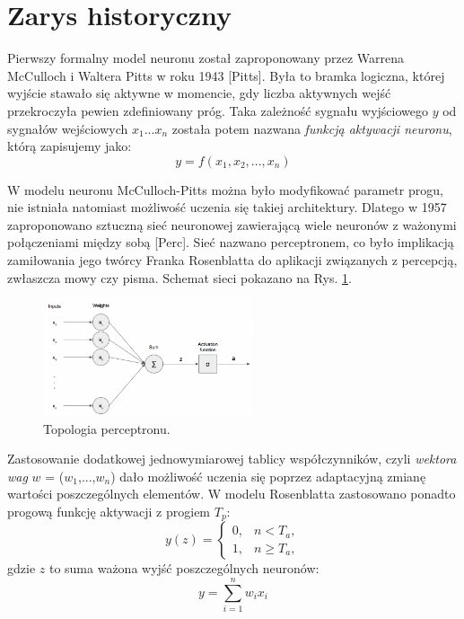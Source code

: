 \section{Zarys historyczny}

Pierwszy formalny model neuronu został zaproponowany przez Warrena McCulloch i Waltera Pitts w roku 1943 [Pitts]. Była to bramka logiczna, której wyjście stawało się aktywne w momencie, gdy liczba aktywnych wejść przekroczyła pewien zdefiniowany próg. Taka zależność sygnału wyjściowego $y$ od sygnałów wejściowych $x_1$...$x_n$ została potem nazwana \textit{funkcją aktywacji neuronu}, którą zapisujemy jako:
\begin{equation}
\label{eqActFunc}
y=f\left(x_1, x_2,..., x_n\right)
\end{equation}

W modelu neuronu McCulloch-Pitts można było modyfikować parametr progu, nie istniała natomiast możliwość uczenia się takiej architektury. Dlatego w 1957 zaproponowano sztuczną sieć neuronowej zawierającą wiele neuronów z ważonymi połączeniami między sobą [Perc]. Sieć nazwano perceptronem, co było implikacją zamiłowania jego twórcy Franka Rosenblatta do aplikacji związanych z percepcją, zwłaszcza mowy czy pisma. Schemat sieci pokazano na Rys. \ref{Perceptron}.
\begin{figure}[h!]
	\centering
	\includegraphics[width=0.55\textwidth]{figures/perceptron.png}
	\caption{Topologia perceptronu.}
	\label{Perceptron}
\end{figure}

Zastosowanie dodatkowej jednowymiarowej tablicy współczynników, czyli \textit{wektora wag} $w$ = ($w_1$,...,$w_n$) dało możliwość uczenia się poprzez adaptacyjną zmianę wartości poszczególnych elementów. W modelu Rosenblatta zastosowano ponadto progową funkcję aktywacji z progiem $T_p$:
\begin{equation}
y(z)=\begin{cases} 0, & n < T_a, \\ 1, & n \ge T_a, \end{cases}
\end{equation}
gdzie $z$ to suma ważona wyjść poszczególnych neuronów:
\begin{equation}
\label{eqLinActFunc}
y=\sum_{i=1}^{n}w_i x_i
\end{equation}

